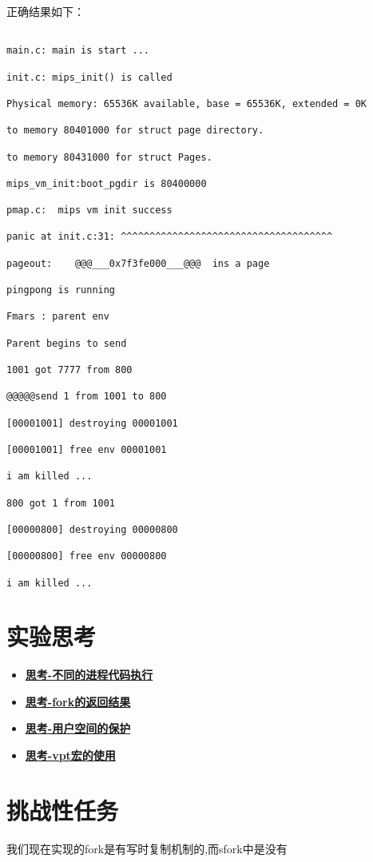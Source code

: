 正确结果如下：

\begin{verbatim}

main.c:	main is start ...

init.c:	mips_init() is called

Physical memory: 65536K available, base = 65536K, extended = 0K

to memory 80401000 for struct page directory.

to memory 80431000 for struct Pages.

mips_vm_init:boot_pgdir is 80400000

pmap.c:	 mips vm init success

panic at init.c:31: ^^^^^^^^^^^^^^^^^^^^^^^^^^^^^^^^^^^^^

pageout:	@@@___0x7f3fe000___@@@  ins a page 

pingpong is running

Fmars : parent env

Parent begins to send

1001 got 7777 from 800

@@@@@send 1 from 1001 to 800

[00001001] destroying 00001001

[00001001] free env 00001001

i am killed ... 

800 got 1 from 1001

[00000800] destroying 00000800

[00000800] free env 00000800

i am killed ... 
\end{verbatim}

\section{实验思考}

\begin{itemize}
	\item \hyperref[think-father-son]{\textbf{\textcolor{baseB}{思考-不同的进程代码执行}}}
	\item \hyperref[think-fork的调用]{\textbf{\textcolor{baseB}{思考-fork的返回结果}}}
	\item \hyperref[think:遍历页]{\textbf{\textcolor{baseB}{思考-用户空间的保护}}}
	\item \hyperref[think:vpt的使用]{\textbf{\textcolor{baseB}{思考-vpt宏的使用}}}
\end{itemize}

\section{挑战性任务}
我们现在实现的fork是有写时复制机制的,而sfork中是没有